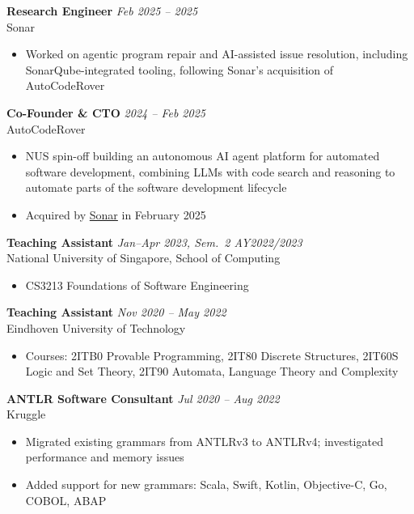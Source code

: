 \documentclass[10pt,a4paper]{article}
\newcommand{\entry}[2]{%
  \noindent\textbf{#1} \hfill \textit{#2}\\[0.1em]
}
\begin{document}
\vspace{0.3em}
\entry{Research Engineer}{Feb 2025 -- 2025}
Sonar
\begin{itemize}
  \item Worked on agentic program repair and AI-assisted issue resolution, including SonarQube-integrated tooling, following Sonar's acquisition of AutoCodeRover
\end{itemize}

\vspace{0.3em}
\entry{Co-Founder \& CTO}{2024 -- Feb 2025}
AutoCodeRover
\begin{itemize}
  \item NUS spin-off building an autonomous AI agent platform for automated software development, combining LLMs with code search and reasoning to automate parts of the software development lifecycle
  \item Acquired by \href{https://www.sonarsource.com/company/press-releases/sonar-acquires-autocoderover-to-supercharge-developers-with-ai-agents/}{Sonar} in February 2025
\end{itemize}

\vspace{0.3em}
\entry{Teaching Assistant}{Jan--Apr 2023, Sem.\ 2 AY2022/2023}
National University of Singapore, School of Computing
\begin{itemize}
  \item CS3213 Foundations of Software Engineering
\end{itemize}

\vspace{0.3em}
\entry{Teaching Assistant}{Nov 2020 -- May 2022}
Eindhoven University of Technology
\begin{itemize}
  \item Courses: 2ITB0 Provable Programming, 2IT80 Discrete Structures, 2IT60S Logic and Set Theory, 2IT90 Automata, Language Theory and Complexity
\end{itemize}

\vspace{0.3em}
\entry{ANTLR Software Consultant}{Jul 2020 -- Aug 2022}
Kruggle
\begin{itemize}
  \item Migrated existing grammars from ANTLRv3 to ANTLRv4; investigated performance and memory issues
  \item Added support for new grammars: Scala, Swift, Kotlin, Objective-C, Go, COBOL, ABAP
\end{itemize}
\end{document}
